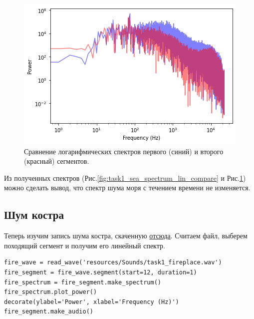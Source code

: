 \documentclass[a4paper, 14pt]{extarticle}
\begin{document}
    \begin{figure}[H]
        \centering
        \includegraphics[width=0.8\linewidth]{resources/Images/task1_sea_spectrum_log_compare}
        \caption{Сравнение логарифмических спектров первого (синий) и второго (красный) сегментов.}
        \label{fig:task1_sea_spectrum_log_compare}
    \end{figure}

    Из полученных спектров (Рис.\ref{fig:task1_sea_spectrum_lin_compare} и Рис.\ref{fig:task1_sea_spectrum_log_compare})
    можно сделать вывод, что спектр шума моря с течением времени не изменяется.

    \newpage
    \subsection{Шум костра}
    \label{subsec:task1_fire}

    Теперь изучим запись шума костра, скаченную \href{https://freesound.org/people/inchadney/sounds/83986/}{отсюда}.
    Считаем файл, выберем походящий сегмент и получим его линейный спектр.

    \begin{lstlisting}[caption= {Чтение файла, выбор сегмента и получение линейного спектра.}, label={lst:task1_fire_spectrum_lin}]
fire_wave = read_wave('resources/Sounds/task1_fireplace.wav')
fire_segment = fire_wave.segment(start=12, duration=1)
fire_spectrum = fire_segment.make_spectrum()
fire_spectrum.plot_power()
decorate(ylabel='Power', xlabel='Frequency (Hz)')
fire_segment.make_audio()  \end{lstlisting}
\end{document}
